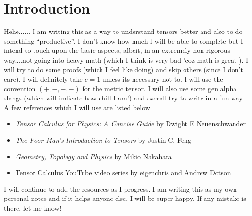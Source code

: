 \section{Introduction}
Hehe...... I am writing this as a way to understand tensors better and also to do something ``productive''. I don't know how much I will be able to complete but I intend to touch upon the basic aspects, albeit, in an extremely non-rigorous way....not going into heavy math (which I think is very bad 'coz math is great ). I will try to do some proofs (which I feel like doing) and skip others (since I don't care). I will definitely take $c=1$ unless its necessary not to. I will use the convention $(+,-,-,-)$ for the metric tensor. I will also use some gen alpha slangs (which will indicate how chill I am!) and overall try to write in a fun way. A few references which I will use are listed below:
\begin{itemize}
    \item \textit{Tensor Calculus for Physics: A Concise Guide
} by Dwight E Neuenschwander
\item \textit{The Poor Man’s Introduction to Tensors} by Justin C. Feng
\item \textit{Geometry, Topology and Physics} by Mikio Nakahara
\item Tensor Calculus YouTube video series by eigenchris and Andrew Dotson
\end{itemize}
I will continue to add the resources as I progress. I am writing this as my own personal notes and if it helps anyone else, I will be super happy. If any mistake is there, let me know! 